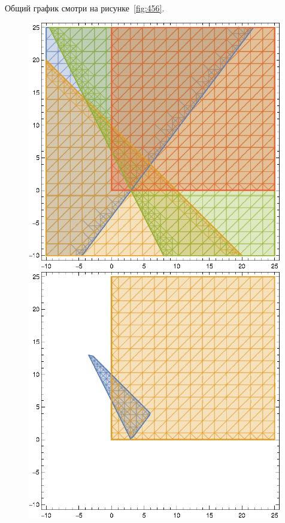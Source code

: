 Общий график смотри на рисунке~\ref{fig:456}.

\begin{figure}[!htb]\centering
  \begin{minipage}{0.32\textwidth}
    \centering

    \includegraphics[width=0.99\textwidth]
    {inc/4.eps}
  \end{minipage}
  \begin{minipage}{0.32\textwidth}
    \centering

    \includegraphics[width=0.99\textwidth]
    {inc/5.eps}
  \end{minipage}
  \begin{minipage}{0.32\textwidth}
    \centering


\end{minipage}
\end{figure}
